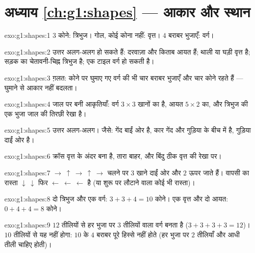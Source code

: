 \section*{अध्याय \ref{ch:g1:shapes} --- आकार और स्थान}

\begin{solution}{exo:g1:shapes:1}
$3$ कोने: त्रिभुज। गोल, कोई कोना नहीं: वृत्त। $4$ बराबर
भुजाएँ: वर्ग।
\end{solution}

\begin{solution}{exo:g1:shapes:2}
उत्तर अलग-अलग हो सकते हैं: दरवाज़ा और किताब आयत हैं; थाली या
घड़ी वृत्त है; सड़क का चेतावनी-चिह्न त्रिभुज है; एक टाइल वर्ग हो
सकती है।
\end{solution}

\begin{solution}{exo:g1:shapes:3}
ग़लत: कोने पर घुमाए गए वर्ग की भी चार बराबर भुजाएँ और चार कोने
रहते हैं --- घुमाने से आकार नहीं बदलता।
\end{solution}

\begin{solution}{exo:g1:shapes:4}
जाल पर बनी आकृतियाँ: वर्ग $3 \times 3$ खानों का है, आयत
$5 \times 2$ का, और त्रिभुज की एक भुजा जाल की तिरछी रेखा
है।
\end{solution}

\begin{solution}{exo:g1:shapes:5}
उत्तर अलग-अलग। जैसे: गेंद बाईं ओर है, कार गेंद और गुड़िया के
बीच में है, गुड़िया दाईं ओर है।
\end{solution}

\begin{solution}{exo:g1:shapes:6}
क्रॉस वृत्त के अंदर बना है, तारा बाहर, और बिंदु ठीक वृत्त की
रेखा पर।
\end{solution}

\begin{solution}{exo:g1:shapes:7}
$\to\ \uparrow\ \to\ \uparrow\ \to$ चलने पर $3$ खाने
दाईं ओर और $2$ ऊपर जाते हैं। वापसी का रास्ता $\downarrow\ \downarrow$ फिर
$\leftarrow\ \leftarrow\ \leftarrow$ है (या शुरू पर लौटाने वाला कोई भी
रास्ता)।
\end{solution}

\begin{solution}{exo:g1:shapes:8}
दो त्रिभुज और एक वर्ग: $3 + 3 + 4 = 10$ कोने। एक वृत्त
और दो आयत: $0 + 4 + 4 = 8$ कोने।
\end{solution}

\begin{solution}{exo:g1:shapes:9}
$12$ तीलियों से हर भुजा पर $3$ तीलियों वाला वर्ग बनता है
($3 + 3 + 3 + 3 = 12$)। $10$ तीलियों से यह नहीं होगा: $10$
के $4$ बराबर पूरे हिस्से नहीं होते (हर भुजा पर $2$ तीलियाँ और
आधी तीली चाहिए होती)।
\end{solution}
